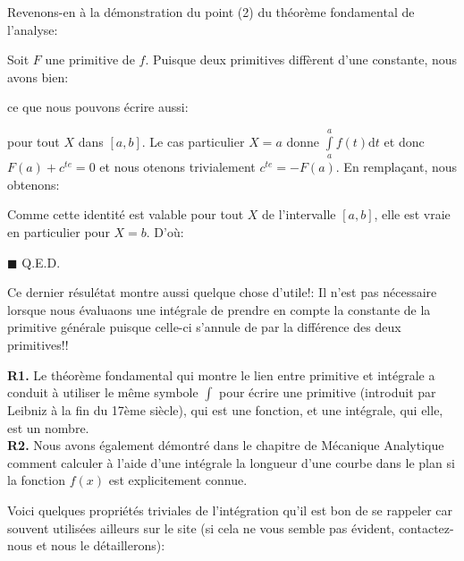 	Revenons-en à la démonstration du point (2) du théorème fondamental de l'analyse:
	\begin{dem}
	Soit $F$ une primitive de $f$. Puisque deux primitives diffèrent d'une constante, nous avons bien:
	
	ce que nous pouvons écrire aussi:
	
	pour tout $X$  dans $[a, b]$. Le cas particulier $X=a$ donne $\int\limits_a^a f(t)\mathrm{d}t$ et donc $F(a)+c^{te}=0$ et nous otenons trivialement $c^{te}=-F(a)$. En remplaçant, nous obtenons:
	
	Comme cette identité est valable pour tout $X$ de l'intervalle $[a,b]$, elle est vraie en particulier pour $X=b$. D'où:
	
	\begin{flushright}
		$\blacksquare$  Q.E.D.
	\end{flushright}
	\end{dem}
	Ce dernier résulétat montre aussi quelque chose d'utile!: Il n'est pas nécessaire lorsque nous évaluaons une intégrale de prendre en compte la constante de la primitive générale puisque celle-ci s'annule de par la différence des deux primitives!!
	\begin{tcolorbox}[title=Remarques,colframe=black,arc=10pt]
	\textbf{R1.} Le théorème fondamental qui montre le lien entre primitive et intégrale a conduit à utiliser le même symbole $\int$ pour écrire une primitive (introduit par Leibniz à la fin du 17ème siècle), qui est une fonction, et une intégrale, qui elle, est un nombre.\\
	
	\textbf{R2.} Nous avons également démontré dans le chapitre de Mécanique Analytique comment calculer à l'aide d'une intégrale la longueur d'une courbe dans le plan si la fonction $f(x)$ est explicitement connue.
	\end{tcolorbox}
	Voici quelques propriétés triviales de l'intégration qu'il est bon de se rappeler car souvent utilisées ailleurs sur le site (si cela ne vous semble pas évident, contactez-nous et nous le détaillerons):
